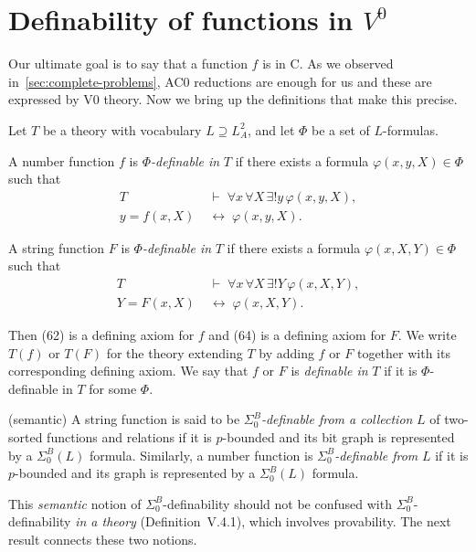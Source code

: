 \section{Definability of functions in \texorpdfstring{$V^0$}{V0}}
Our ultimate goal is to say that a function $f$ is in C.
As we observed in~\ref{sec:complete-problems}, AC0 reductions are enough for us
and these are expressed by V0 theory. Now we bring up the definitions that make this precise.

\begin{definition}
Let \(T\) be a theory with vocabulary \(L \supseteq L^2_A\), and let \(\Phi\) be a set of \(L\)-formulas.

\medskip
A number function \(f\) is \(\Phi\)\textit{-definable in} \(T\) if there exists a formula
\(\varphi(x, y, X) \in \Phi\) such that
\begin{align}
T &\;\vdash\; \forall x \, \forall X \, \exists! y \, \varphi(x, y, X), \tag{61} \\[4pt]
y = f(x, X) &\;\leftrightarrow\; \varphi(x, y, X). \tag{62}
\end{align}

\medskip
A string function \(F\) is \(\Phi\)\textit{-definable in} \(T\) if there exists a formula
\(\varphi(x, X, Y) \in \Phi\) such that
\begin{align}
T &\;\vdash\; \forall x \, \forall X \, \exists! Y \, \varphi(x, X, Y), \tag{63} \\[4pt]
Y = F(x, X) &\;\leftrightarrow\; \varphi(x, X, Y). \tag{64}
\end{align}

\medskip
Then \textup{(62)} is a defining axiom for \(f\) and \textup{(64)} is a defining axiom for \(F\).
We write \(T(f)\) or \(T(F)\) for the theory extending \(T\) by adding \(f\) or \(F\)
together with its corresponding defining axiom.
We say that \(f\) or \(F\) is \textit{definable in} \(T\) if it is \(\Phi\)-definable in \(T\)
for some \(\Phi\).
\end{definition}


\begin{definition}[V.4.12] (semantic)
A string function is said to be \(\Sigma^B_0\)\textit{-definable from a collection} \(L\) of two-sorted functions and relations if it is \(p\)-bounded and its bit graph is represented by a \(\Sigma^B_0(L)\) formula.  
Similarly, a number function is \(\Sigma^B_0\)\textit{-definable from} \(L\) if it is \(p\)-bounded and its graph is represented by a \(\Sigma^B_0(L)\) formula.

\medskip
This \emph{semantic} notion of \(\Sigma^B_0\)-definability should not be confused with \(\Sigma^B_0\)-definability \emph{in a theory} (Definition~V.4.1), which involves provability.  
The next result connects these two notions.
\end{definition}

